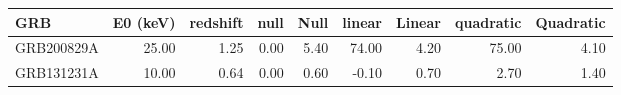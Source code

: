\begin{tabular}{lrrrrrrrr}
\toprule
GRB & E0 (keV) & redshift & null & Null & linear & Linear & quadratic & Quadratic \\
\midrule
GRB200829A & 25.00 & 1.25 & 0.00 & 5.40 & 74.00 & 4.20 & 75.00 & 4.10 \\
GRB131231A & 10.00 & 0.64 & 0.00 & 0.60 & -0.10 & 0.70 & 2.70 & 1.40 \\
\bottomrule
\end{tabular}

